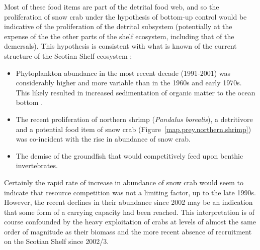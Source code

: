 \documentclass[11pt]{article}
\begin{document}
\begin{enumerate}
  Most of these food items are part of the detrital food web, and so the proliferation of snow crab under the hypothesis of bottom-up control would be indicative of the proliferation of the detrital subsystem (potentially at the expense of the the other parts of the shelf ecosystem, including that of the demersals). This hypothesis is consistent with what is known of the current structure of the Scotian Shelf ecosystem \citep{Choi2005}: 
  \begin{itemize}
    \item Phytoplankton abundance in the most recent decade (1991-2001) was considerably higher and more variable than in the 1960s and early 1970s. This likely resulted in increased sedimentation of organic matter to the ocean bottom \citep{Choi2005}.
    \item The recent proliferation of northern shrimp (\textit{Pandalus borealis}), a detritivore and a potential food item of snow crab (Figure~\ref{map.prey.northern.shrimp}) was co-incident with the rise in abundance of snow crab.
    \item The demise of the groundfish that would competitively feed upon benthic invertebrates.
  \end{itemize} 

  Certainly the rapid rate of increase in abundance of snow crab would seem to indicate that resource competition was not a limiting factor, up to the late 1990s. However, the recent declines in their abundance since 2002 may be an indication that some form of a carrying capacity had been reached. This interpretation is of course confounded by the heavy exploitation of crabs at levels of almost the same order of magnitude as their biomass and the more recent absence of recruitment on the Scotian Shelf since 2002/3.







\end{enumerate}
\end{document}
